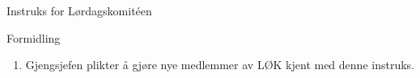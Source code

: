 \documentclass[../fsbok.tex]{subfiles}
\begin{document}
\begin{instruks*}{Instruks for Lørdagskomit\'een}
    \begin{instruksledd}{Formidling}
        \begin{enumerate}
            \item Gjengsjefen plikter å gjøre nye medlemmer av LØK kjent med denne instruks.
        \end{enumerate}
    \end{instruksledd}

\end{instruks*}
\end{document}
